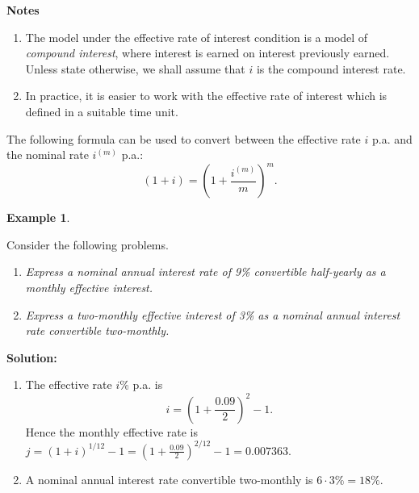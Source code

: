 \documentclass[
]{book}
\theoremstyle{definition}
\theoremstyle{definition}
\newtheorem{example}{Example}[chapter]
\theoremstyle{definition}
\theoremstyle{definition}
\theoremstyle{remark}
\begin{document}
\textbf{Notes}

\begin{enumerate}
\def\labelenumi{\arabic{enumi}.}
\item
  The model under the effective rate of interest condition is a
  model of \emph{compound interest}, where interest is earned on interest
  previously earned. Unless state otherwise, we shall assume that \(i\) is
  the compound interest rate.
\item
  In practice, it is easier to work with the effective rate of
  interest which is defined in a suitable time unit.
\end{enumerate}

The following formula can be used to convert between the effective rate
\(i\) p.a. and the nominal rate \(i^{(m)}\) p.a.:
\[( 1 + i) = \left( 1 + \frac{i^{(m)}}{m}\right)^m.\]

\begin{example}
\protect\hypertarget{exm:unlabeled-div-13}{}\label{exm:unlabeled-div-13}

Consider the following problems.

\begin{enumerate}
\def\labelenumi{\arabic{enumi}.}
\item
  \emph{Express a nominal annual interest rate of 9\% convertible
  half-yearly as a monthly effective interest.}
\item
  \emph{Express a two-monthly effective interest of 3\% as a nominal annual
  interest rate convertible two-monthly.}
\end{enumerate}

\end{example}

\textbf{Solution:}

\begin{enumerate}
\def\labelenumi{\arabic{enumi}.}
\item
  The effective rate \(i\)\% p.a. is \[i = ( 1 + \frac{0.09}{2})^2 - 1.\]
  Hence the monthly effective rate is
  \(j = (1 + i)^{1/12} - 1 = ( 1 + \frac{0.09}{2})^{2/12} - 1 = 0.007363\).
\item
  A nominal annual interest rate convertible two-monthly is
  \(6 \cdot 3\% = 18\%\).
\end{enumerate}
\end{document}

